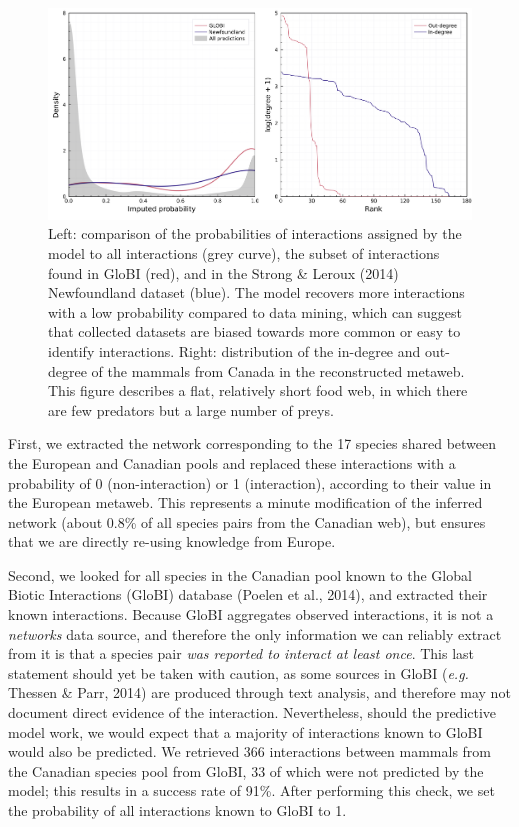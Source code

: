 \documentclass[11pt]{article}
\makeatletter
\def\maxwidth{\ifdim\Gin@nat@width>\linewidth\linewidth
\else\Gin@nat@width\fi}
\let\Oldincludegraphics\includegraphics
\renewcommand{\includegraphics}[1]{\Oldincludegraphics[width=\maxwidth]{#1}}
\makeatother
\begin{document}
\begin{figure}
\hypertarget{fig:inflation}{%
\centering
\includegraphics{figures/figure-validation.png}
\caption{Left: comparison of the probabilities of interactions assigned
by the model to all interactions (grey curve), the subset of
interactions found in GloBI (red), and in the Strong \& Leroux (2014)
Newfoundland dataset (blue). The model recovers more interactions with a
low probability compared to data mining, which can suggest that
collected datasets are biased towards more common or easy to identify
interactions. Right: distribution of the in-degree and out-degree of the
mammals from Canada in the reconstructed metaweb. This figure describes
a flat, relatively short food web, in which there are few predators but
a large number of preys.}\label{fig:inflation}
}
\end{figure}

First, we extracted the network corresponding to the 17 species shared
between the European and Canadian pools and replaced these interactions
with a probability of 0 (non-interaction) or 1 (interaction), according
to their value in the European metaweb. This represents a minute
modification of the inferred network (about 0.8\% of all species pairs
from the Canadian web), but ensures that we are directly re-using
knowledge from Europe.

Second, we looked for all species in the Canadian pool known to the
Global Biotic Interactions (GloBI) database (Poelen et al., 2014), and
extracted their known interactions. Because GloBI aggregates observed
interactions, it is not a \emph{networks} data source, and therefore the
only information we can reliably extract from it is that a species pair
\emph{was reported to interact at least once}. This last statement
should yet be taken with caution, as some sources in GloBI (\emph{e.g.}
Thessen \& Parr, 2014) are produced through text analysis, and therefore
may not document direct evidence of the interaction. Nevertheless,
should the predictive model work, we would expect that a majority of
interactions known to GloBI would also be predicted. We retrieved 366
interactions between mammals from the Canadian species pool from GloBI,
33 of which were not predicted by the model; this results in a success
rate of 91\%. After performing this check, we set the probability of all
interactions known to GloBI to 1.
\end{document}
